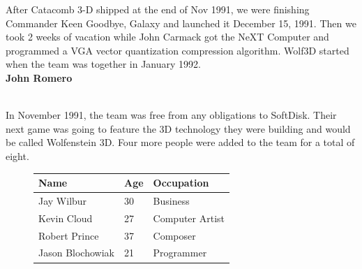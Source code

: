 \documentclass[book.tex]{subfiles}
\begin{document}
\par
\begin{fancyquotes}
After Catacomb 3-D shipped at the end of Nov 1991, we were finishing Commander Keen Goodbye, Galaxy and launched it December 15, 1991. Then we took 2 weeks of vacation while John Carmack got the NeXT Computer and programmed a VGA vector quantization compression algorithm. Wolf3D started when the team was together in January 1992.
 \bigskip \\
\textbf{John Romero}
 \end{fancyquotes}\\

In November 1991, the team was free from any obligations to SoftDisk. Their next game was going to feature the 3D technology they were building and would be called Wolfenstein 3D. Four more people were added to the team for a total of eight.
 \begin{figure}[H]

\centering  
\begin{tabularx}{\textwidth}{ X  X  X  }
  \toprule
  \textbf{Name} &  \textbf{Age} & \textbf{Occupation} \\
  \toprule 
   Jay Wilbur & 30 &  Business\\
   Kevin Cloud\protect\footnotemark & 27 &  Computer Artist\\
   Robert Prince\protect\footnotemark & 37 &  Composer\\
   Jason Blochowiak\protect\footnotemark & 21 &   Programmer\\
     \toprule
\end{tabularx}
\label{fig:Id Software hires}
\end{figure}
\addtocounter{footnote}{-2}

\end{document}
